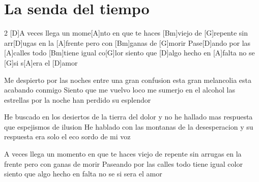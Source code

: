 \section{La senda del tiempo}
\begin{guitar}
\begin{multicols}{2}
[D]A veces llega un mome[A]nto en que
te haces [Bm]viejo de [G]repente
sin arr[D]ugas en la [A]frente
pero con [Bm]ganas de [G]morir
Pase[D]ando por las [A]calles
todo [Bm]tiene igual co[G]lor
siento que [D]algo hecho en [A]falta
no se [G]si s[A]era el [D]amor


Me despierto por las noches
entre una gran confusion
esta gran melancolia
esta acabando conmigo
Siento que me vuelvo loco
me sumerjo en el alcohol
las estrellas por la noche
han perdido su esplendor



He buscado en los desiertos
de la tierra del dolor
y no he hallado mas respuesta
que espejismos de ilusion
He hablado con las montanas
de la desesperacion
y su respuesta era solo
el eco sordo de mi voz


A veces llega un momento en que
te haces viejo de repente
sin arrugas en la frente
pero con ganas de morir
Paseando por las calles
todo tiene igual color
siento que algo hecho en falta
no se si sera el amor
\end{multicols}
\end{guitar}
